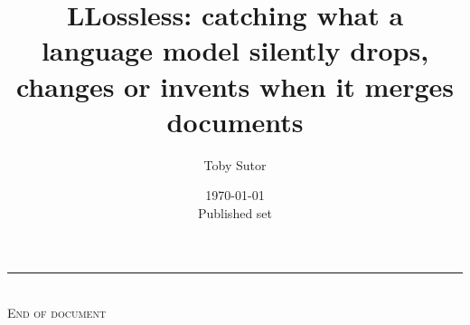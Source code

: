 \documentclass[11pt]{article}
\title{LLossless: catching what a language model silently drops,\\
       changes or invents when it merges documents}
\author{Toby Sutor}
\date{\today\\[2pt]%
  \normalsize Published set \texttt{\ccnum{build.digest}}}
\begin{document}
\maketitle

\begin{abstract}

\end{abstract}














\appendix



\par\nopagebreak\vspace{1.2em}
\begin{center}
  \rule{0.3\linewidth}{0.4pt}\\[6pt]
  {\small\textsc{End of document}}
\end{center}
\end{document}
